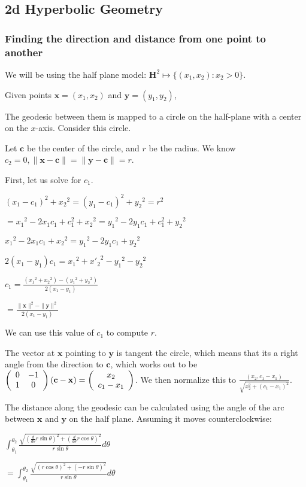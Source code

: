 \subsection{2d Hyperbolic Geometry}

\subsubsection{Finding the direction and distance from one point to another}

We will be using the half plane model: $\textbf{H}^2 \mapsto \{(x_1,x_2):x_2 > 0\}$.

Given points $\textbf{x} = (x_1,x_2)$ and $\textbf{y} = (y_1,y_2)$,

The geodesic between them is mapped to a circle on the half-plane with a center on the $x$-axis. Consider this circle.

Let $\textbf{c}$ be the center of the circle, and $r$ be the radius. We know $c_2 = 0, \|\textbf{x}-\textbf{c}\| = \|\textbf{y}-\textbf{c}\| = r$.

First, let us solve for $c_1$.

$(x_1-c_1)^2+{x_2}^2 = (y_1-c_1)^2+{y_2}^2 = r^2$

$= {x_1}^2-2x_1c_1+c_1^2+{x_2}^2 = {y_1}^2-2y_1c_1+c_1^2+{y_2}^2$

${x_1}^2-2x_1c_1+{x_2}^2 = {y_1}^2-2y_1c_1+{y_2}^2$

$2(x_1-y_1)c_1 = {x_1}^2+{x'_2}^2-{y_1}^2-{y_2}^2$

$c_1 = \frac{({x_1}^2+{x_2}^2)-({y_1}^2+{y_2}^2)}{2(x_1-y_1)}$

$= \frac{\|\textbf{x}\|^2-\|\textbf{y}\|^2}{2(x_1-y_1)}$

We can use this value of $c_1$ to compute $r$.

The vector at $\textbf{x}$ pointing to $\textbf{y}$ is tangent the circle, which means that its a right angle from the direction to $\textbf{c}$, which works out to be $\left(\begin{array}{ccc} 0 & -1 \\1 & 0 \end{array} \right)(\textbf{c}-\textbf{x}) = \left(\begin{array}{ccc} x_2 \\c_1-x_1 \end{array} \right)$. We then normalize this to $\frac{(x_2,c_1-x_1)}{\sqrt{x_2^2+(c_1-x_1)^2}}$.

The distance along the geodesic can be calculated using the angle of the arc between $\textbf{x}$ and $\textbf{y}$ on the half plane. Assuming it moves counterclockwise:

$\int_{\theta_1}^{\theta_2} \frac{\sqrt{(\frac{d}{d\theta}r\sin\theta)^2+(\frac{d}{d\theta}r\cos\theta)^2}}{r\sin\theta} d\theta$

$= \int_{\theta_1}^{\theta_2} \frac{\sqrt{(r\cos\theta)^2+(-r\sin\theta)^2}}{r\sin\theta} d\theta$

